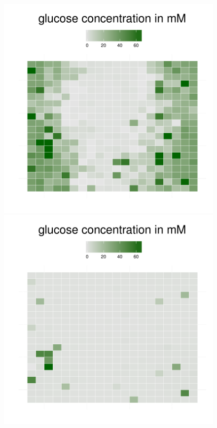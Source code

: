 \begin{figure}[h!]
{\begin{minipage}[t]{0.3\textwidth}
  \end{minipage}
  \begin{minipage}[t]{0.3\textwidth}
    \includegraphics[width=\textwidth]{../results/ecoli_beijerinckii_20x20_seed5147_gluc55.pdf}
  \end{minipage}
  \begin{minipage}[t]{0.3\textwidth}
    \includegraphics[width=\textwidth]{../results/ecoli_beijerinckii_20x20_seed5147_gluc75.pdf}

\end{minipage}}
\end{figure}
